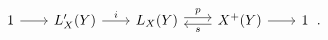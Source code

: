 \[
\begin{tikzcd}[column sep=2.0em]
 1 \arrow[r]
 & L'_X(Y) \arrow[r,"i"]
 & L_X(Y)
     \arrow[r,shift left=0.55ex,"p"]
 & X^+(Y)
     \arrow[l,shift left=0.55ex,"s"]
     \arrow[r]
 & 1
\end{tikzcd}
\, .
\]
